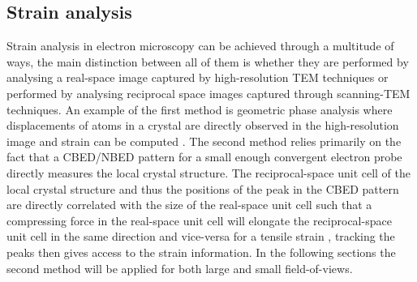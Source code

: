 \subsection{Strain analysis}
Strain analysis in electron microscopy can be achieved through a multitude of ways, the main distinction between all of them is whether they are performed by analysing a real-space image captured by high-resolution TEM techniques or performed by analysing reciprocal space images captured through scanning-TEM techniques. An example of the first method is geometric phase analysis where displacements of atoms in a crystal are directly observed in the high-resolution image and strain can be computed \cite{HYTCH1998131, hytchGEOMETRICPHASEANALYSIS, nguyenAtomicDefectsDoping2017}. The second method relies primarily on the fact that a CBED/NBED pattern for a small enough convergent electron probe directly measures the local crystal structure. The reciprocal-space unit cell of the local crystal structure and thus the positions of the peak in the CBED pattern are directly correlated with the size of the real-space unit cell such that a compressing force in the real-space unit cell will elongate the reciprocal-space unit cell in the same direction and vice-versa for a tensile strain \cite{ophusFourDimensionalScanningTransmission2019, vanwinkleRotationalDilationalReconstruction2023, kazmierczakStrainFieldsTwisted2021, hanStrainMappingTwoDimensional2018}, tracking the peaks then gives access to the strain information.  In the following sections the second method will be applied for both large and small field-of-views.

